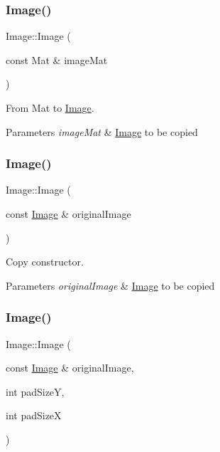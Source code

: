 \subsubsection{\texorpdfstring{Image()}{Image()}\hspace{0.1cm}{\footnotesize\ttfamily [2/5]}}
{\footnotesize\ttfamily Image\+::\+Image (\begin{DoxyParamCaption}\item[{const Mat \&}]{image\+Mat }\end{DoxyParamCaption})}



From Mat to \mbox{\hyperlink{classImage}{Image}}. 


\begin{DoxyParams}{Parameters}
{\em image\+Mat} & \mbox{\hyperlink{classImage}{Image}} to be copied \\
\hline
\end{DoxyParams}
\mbox{\label{classImage_a30440c1cf34a9903677f01beeba11fc6}} 
\subsubsection{\texorpdfstring{Image()}{Image()}\hspace{0.1cm}{\footnotesize\ttfamily [3/5]}}
{\footnotesize\ttfamily Image\+::\+Image (\begin{DoxyParamCaption}\item[{const \mbox{\hyperlink{classImage}{Image}} \&}]{original\+Image }\end{DoxyParamCaption})}



Copy constructor. 


\begin{DoxyParams}{Parameters}
{\em original\+Image} & \mbox{\hyperlink{classImage}{Image}} to be copied \\
\hline
\end{DoxyParams}
\mbox{\label{classImage_a4659ef8497580de3385deecd66ff948e}} 
\subsubsection{\texorpdfstring{Image()}{Image()}\hspace{0.1cm}{\footnotesize\ttfamily [4/5]}}
{\footnotesize\ttfamily Image\+::\+Image (\begin{DoxyParamCaption}\item[{const \mbox{\hyperlink{classImage}{Image}} \&}]{original\+Image,  }\item[{int}]{pad\+SizeY,  }\item[{int}]{pad\+SizeX }\end{DoxyParamCaption})}



